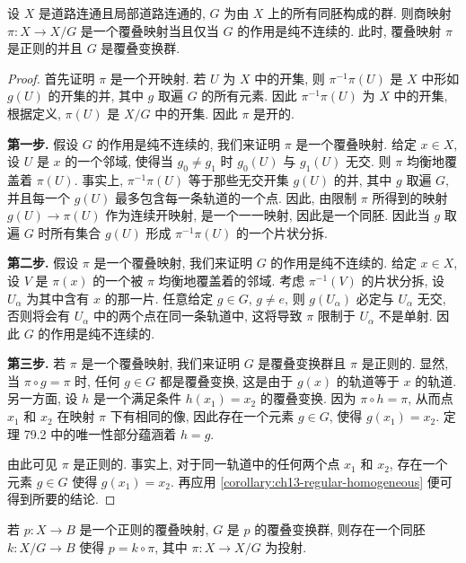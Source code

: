 \begin{theorem}[纯不连续作用给出正则覆叠]
\label{theorem:ch13-properly-discontinuous}
设 $X$ 是道路连通且局部道路连通的, $G$ 为由 $X$ 上的所有同胚构成的群. 则商映射 $\pi\colon X\to X/G$ 是一个覆叠映射当且仅当 $G$ 的作用是纯不连续的. 此时, 覆叠映射 $\pi$ 是正则的并且 $G$ 是覆叠变换群.
\end{theorem}

\begin{proof}
首先证明 $\pi$ 是一个开映射. 若 $U$ 为 $X$ 中的开集, 则 $\pi^{-1}\pi(U)$ 是 $X$ 中形如 $g(U)$ 的开集的并, 其中 $g$ 取遍 $G$ 的所有元素. 因此 $\pi^{-1}\pi(U)$ 为 $X$ 中的开集, 根据定义, $\pi(U)$ 是 $X/G$ 中的开集. 因此 $\pi$ 是开的.

\textbf{第一步.} 假设 $G$ 的作用是纯不连续的, 我们来证明 $\pi$ 是一个覆叠映射. 给定 $x\in X$, 设 $U$ 是 $x$ 的一个邻域, 使得当 $g_{0}\neq g_{1}$ 时 $g_{0}(U)$ 与 $g_{1}(U)$ 无交. 则 $\pi$ 均衡地覆盖着 $\pi(U)$. 事实上, $\pi^{-1}\pi(U)$ 等于那些无交开集 $g(U)$ 的并, 其中 $g$ 取遍 $G$, 并且每一个 $g(U)$ 最多包含每一条轨道的一个点. 因此, 由限制 $\pi$ 所得到的映射 $g(U)\to\pi(U)$ 作为连续开映射, 是一个一一映射, 因此是一个同胚. 因此当 $g$ 取遍 $G$ 时所有集合 $g(U)$ 形成 $\pi^{-1}\pi(U)$ 的一个片状分拆.

\textbf{第二步.} 假设 $\pi$ 是一个覆叠映射, 我们来证明 $G$ 的作用是纯不连续的. 给定 $x\in X$, 设 $V$ 是 $\pi(x)$ 的一个被 $\pi$ 均衡地覆盖着的邻域. 考虑 $\pi^{-1}(V)$ 的片状分拆, 设 $U_{\alpha}$ 为其中含有 $x$ 的那一片. 任意给定 $g\in G$, $g\neq e$, 则 $g(U_{\alpha})$ 必定与 $U_{\alpha}$ 无交, 否则将会有 $U_{\alpha}$ 中的两个点在同一条轨道中, 这将导致 $\pi$ 限制于 $U_{\alpha}$ 不是单射. 因此 $G$ 的作用是纯不连续的.

\textbf{第三步.} 若 $\pi$ 是一个覆叠映射, 我们来证明 $G$ 是覆叠变换群且 $\pi$ 是正则的. 显然, 当 $\pi\circ g=\pi$ 时, 任何 $g\in G$ 都是覆叠变换, 这是由于 $g(x)$ 的轨道等于 $x$ 的轨道. 另一方面, 设 $h$ 是一个满足条件 $h(x_{1})=x_{2}$ 的覆叠变换. 因为 $\pi\circ h=\pi$, 从而点 $x_{1}$ 和 $x_{2}$ 在映射 $\pi$ 下有相同的像, 因此存在一个元素 $g\in G$, 使得 $g(x_{1})=x_{2}$. 定理 79.2 中的唯一性部分蕴涵着 $h=g$.

由此可见 $\pi$ 是正则的. 事实上, 对于同一轨道中的任何两个点 $x_{1}$ 和 $x_{2}$, 存在一个元素 $g\in G$ 使得 $g(x_{1})=x_{2}$. 再应用 \cref{corollary:ch13-regular-homogeneous} 便可得到所要的结论.
\end{proof}

\begin{theorem}[正则覆叠空间的轨道表示]
\label{theorem:ch13-regular-orbit}
若 $p\colon X\to B$ 是一个正则的覆叠映射, $G$ 是 $p$ 的覆叠变换群, 则存在一个同胚 $k\colon X/G\to B$ 使得 $p=k\circ\pi$, 其中 $\pi\colon X\to X/G$ 为投射.
\end{theorem}

